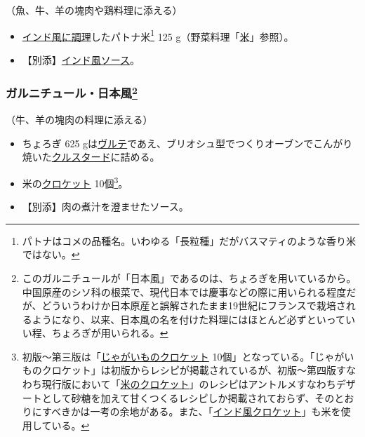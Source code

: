 \begin{recette}
（魚、牛、羊の塊肉や鶏料理に添える）

\begin{itemize}
\item
  \protect\hyperlink{riz-a-l-indienne}{インド風に調理}したパトナ米\footnote{パトナはコメの品種名。いわゆる「長粒種」だがバスマティのような香り米ではない。}
  125 g（野菜料理「\protect\hyperlink{riz}{米}」参照）。
\item
  【別添】\protect\hyperlink{sauce-a-l-indienne}{インド風ソース}。
\end{itemize}

\atoaki{}

\hypertarget{garniture-a-la-japonaise}{%
\subsubsection[ガルニチュール・日本風]{\texorpdfstring{ガルニチュール・日本風\footnote{このガルニチュールが「日本風」であるのは、ちょろぎを用いているから。中国原産のシソ科の根菜で、現代日本では慶事などの際に用いられる程度だが、どういうわけか日本原産と誤解されたまま19世紀にフランスで栽培されるようになり、以来、日本風の名を付けた料理にはほとんど必ずといっていい程、ちょろぎが用いられる。}}{ガルニチュール・日本風}}\label{garniture-a-la-japonaise}}



（牛、羊の塊肉の料理に添える）

\begin{itemize}
\item
  ちょろぎ 625
  gは\protect\hyperlink{veloute}{ヴルテ}であえ、ブリオシュ型でつくりオーブンでこんがり焼いた\protect\hyperlink{croustades}{クルスタード}に詰める。
\item
  米の\protect\hyperlink{croquettes}{クロケット} 10個\footnote{初版〜第三版は「\protect\hyperlink{croquettes-de-pommes-de-terre}{じゃがいものクロケット}
    10個」となっている。「じゃがいものクロケット」は初版からレシピが掲載されているが、初版〜第四版すなわち現行版において「\href{Ecroquettes-de-riz}{米のクロケット}」のレシピはアントルメすなわちデザートとして砂糖を加えて甘くつくるレシピしか掲載されておらず、そのとおりにすべきかは一考の余地がある。また、「\protect\hyperlink{croquettes-a-l-indienne}{インド風クロケット}」も米を使用している。}。
\item
  【別添】肉の煮汁を澄ませたソース。
\end{itemize}


\end{recette}
